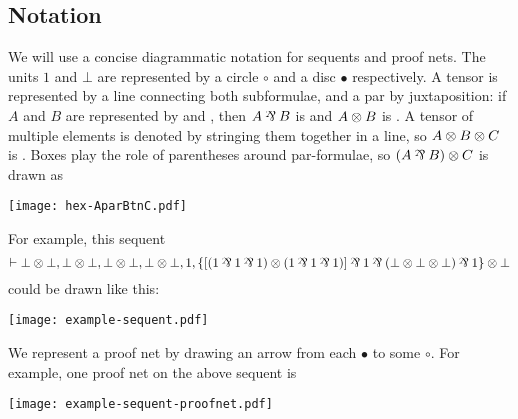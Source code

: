 \subsection{Notation}


We will use a concise diagrammatic notation for sequents and proof nets.
%
The units $1$ and $\bot$ are represented by a circle $\circ$ and a disc $\bullet$ respectively.
%
A tensor is represented by a line connecting both subformulae, and a par by juxtaposition: if $A$ and $B$ are represented by 
and ,
%
then $A\parr B$ is 
and $A\otimes B$ is .
%
A tensor of multiple elements is denoted by stringing them together in a line, so $A\otimes B\otimes C$ is
.
%
Boxes play the role of parentheses around par-formulae, so $(A\parr B)\tn C$ is drawn as \begin{center}{\texttt{[image: hex-AparBtnC.pdf]}}\end{center}

\noindent For example, this sequent
\[ \vdash \bot\tn\bot, \bot\tn\bot, \bot\tn\bot, \bot\tn\bot, 1, \{[(1\parr 1\parr 1)\tn(1\parr 1\parr 1)]\parr 1\parr (\bot\tn\bot\tn\bot)\parr 1\}\tn\bot \]
could be drawn like this:
\begin{center}\texttt{[image: example-sequent.pdf]}\end{center}

\noindent We represent a proof net by drawing an arrow from each $\bullet$ to some $\circ$. For example, one proof net on the above sequent is
\begin{center}\texttt{[image: example-sequent-proofnet.pdf]}\end{center}







